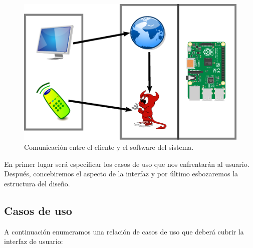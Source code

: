 \smallskip

\begin{figure}[H]
	\noindent \begin{centering}
		\includegraphics[width=\linewidth*2/3]{capitulo4/despliegue}
		\par\end{centering}
	\smallskip
	\caption[Comunicación entre el cliente y el software del sistema]{\label{fig:despliegue} Comunicación entre el cliente y el software del sistema. \cite{svg_raspberry}}
\end{figure} 

\smallskip

En primer lugar será especificar los casos de uso que nos enfrentarán al usuario. Después, concebiremos el aspecto de la interfaz y por último esbozaremos la estructura del diseño.

\subsection{Casos de uso}

A continuación enumeramos una relación de casos de uso que deberá cubrir la interfaz de usuario:

